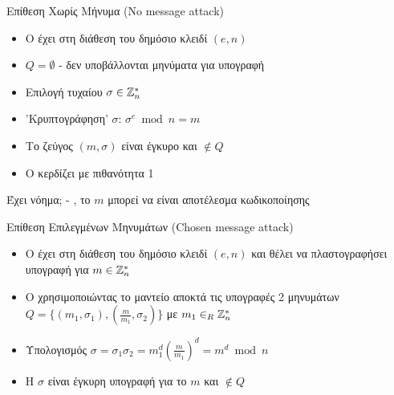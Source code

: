 \documentclass[handout]{beamer}
\begin{document}
\begin{frame}{Επίθεση Χωρίς Μήνυμα (No message attack)}
\begin{itemize}
\item O \adv έχει στη διάθεση του δημόσιο κλειδί $(e,n)$
\pause
\item $Q = \emptyset$ - δεν υποβάλλονται μηνύματα για υπογραφή
\pause
\item Επιλογή τυχαίου $\sigma \in \mathbb{Z}^*_n$
\pause
\item 'Kρυπτογράφηση' $\sigma$: $\sigma^e \bmod n = m$
\pause
\item Το ζεύγος $(m,\sigma)$ είναι έγκυρο και $\not \in Q$
\pause
\item O \adv κερδίζει με πιθανότητα 1
\end{itemize}

\alert{Έχει νόημα;} - , το $m$ μπορεί να είναι αποτέλεσμα κωδικοποίησης
\end{frame}

\begin{frame}{Επίθεση Επιλεγμένων Μηνυμάτων (Chosen message attack)}
\begin{itemize}
\item O \adv έχει στη διάθεση του δημόσιο κλειδί $(e,n)$ και θέλει να πλαστογραφήσει υπογραφή για $m \in \mathbb{Z}^*_n$
\pause
\item O \adv χρησιμοποιώντας το μαντείο αποκτά τις υπογραφές 2 μηνυμάτων $Q = \{ (m_1, \sigma_1), (\frac{m}{m_1}, \sigma_2) \}$ με $m_1 \in_R \mathbb{Z}^*_n $
\pause
\item Υπολογισμός $\sigma = \sigma_1  \sigma_2 = m_1^d (\frac{m}{m_1})^d = m ^ d \bmod{n}$
\pause
\item H $\sigma$ είναι έγκυρη υπογραφή για το $m$ και $\not \in Q$
\end{itemize}
\end{frame}
\end{document}

